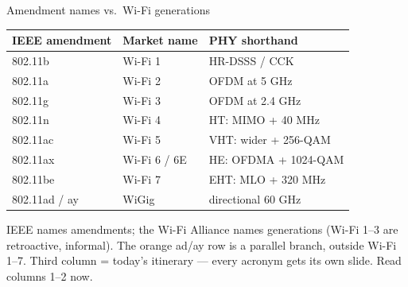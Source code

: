 \begin{frame}{Amendment names vs.\ Wi-Fi generations}
  \centering
  \small
  \begin{tabular}{@{}lll@{}}
    \toprule
    \textbf{IEEE amendment} & \textbf{Market name} & \textbf{PHY shorthand} \\
    \midrule
    802.11b  & Wi-Fi 1 & HR-DSSS / CCK \\
    802.11a  & Wi-Fi 2 & OFDM at 5 GHz \\
    802.11g  & Wi-Fi 3 & OFDM at 2.4 GHz \\
    802.11n  & Wi-Fi 4 & HT: MIMO + 40 MHz \\
    802.11ac & Wi-Fi 5 & VHT: wider + 256-QAM \\
    802.11ax & Wi-Fi 6 / 6E & HE: OFDMA + 1024-QAM \\
    802.11be & Wi-Fi 7 & EHT: MLO + 320 MHz \\
    \textcolor{coreorange}{802.11ad / ay} & \textcolor{coreorange}{WiGig} &
      \textcolor{coreorange}{directional 60 GHz} \\
    \bottomrule
  \end{tabular}

  \vspace{0.15em}
  {\scriptsize\textcolor{softgray}{IEEE names amendments; the Wi-Fi Alliance names
    generations (Wi-Fi 1--3 are retroactive, informal). The orange ad/ay row is a
    parallel branch, outside Wi-Fi 1--7. Third column = today's itinerary ---
    every acronym gets its own slide. Read columns 1--2 now.}\par}

  \vspace{0.15em}

\end{frame}

